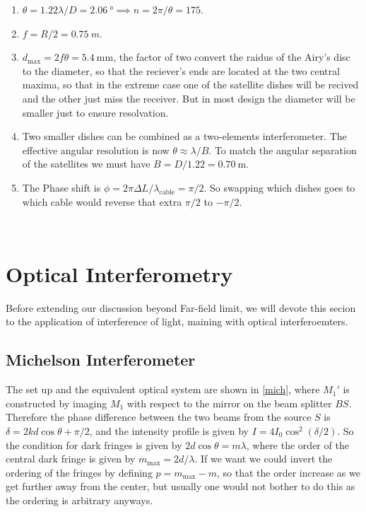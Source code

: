 \documentclass[english,a4paper,12pt]{report}
\begin{document}
{\begin{enumerate}
    \item \(\theta = 1.22 \lambda /D = \SI{2.06}{\degree} \implies n = 2\pi / \theta = 175\).
    
    \item \(f = R/2 = \SI{0.75}{m}  \).
    
    \item \(d _{\text{max} } = 2 f \theta = \SI{5.4}{\mm}  \), the factor of two convert the raidus of the Airy's disc to the diameter, so that the reciever's ends are located at the two central maxima, so that in the extreme case one of the satellite dishes will be recived and the other just miss the receiver. But in most design the diameter will be smaller just to ensure resolvation. 
    
    \item Two smaller dishes can be combined as a two-elements interferometer. The effective angular resolution is now \(\theta \approx \lambda /B\). To match the angular separation of the satellites we must have \(B = D/1.22 = \SI{0.70}{\m} \). 
    
    \item The Phase shift is \(\phi = 2\pi \Delta L / \lambda _{\text{cable} } = \pi /2\). So swapping which dishes goes to which cable would reverse that extra \(\pi /2\) to \(-\pi /2\).   
\end{enumerate}
~
} 


\section{Optical Interferometry}

Before extending our discussion beyond Far-field limit, we will devote this secion to the application of interference of light, maining with optical interferoemters.

\subsection{Michelson Interferometer}

The set up and the equivalent optical system are shown in \cref{mich}, where \(M_1 '\) is constructed by imaging \(M_1 \) with respect to the mirror on the beam splitter \(BS\). Therefore the phase difference between the two beams from the source \(S\) is \(\delta  = 2kd \cos \theta + \pi /2\), and the intensity profile is given by \(I = 4I_0  \cos ^2( \delta /2)\). So the condition for dark fringes is given by \(2d \cos \theta = m\lambda \), where the order of the central dark fringe is given by \(m_{\text{max} }= 2d /\lambda \). If we want we could invert the ordering of the fringes by defining \(p = m_{\text{max} } - m \), so that the order increase as we get further away from the center, but usually one would not bother to do this as the ordering is arbitrary anyways. 
\end{document}
